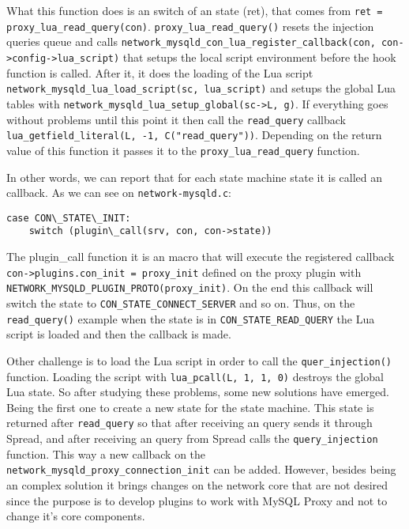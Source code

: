 What this function does is an switch of an state (ret), that comes from \texttt{ret = proxy\_lua\-\_read\_query(con)}. \texttt{proxy\_lua\_read\_query()} resets the 
injection queries queue and calls \texttt{network\_mysqld\_con\_lua\_register\_callback(con, con->config->lua\_script)} that setups the local script environment 
before the hook function is called. After it, it does the loading of the Lua script \texttt{network\_mysqld\_lua\_load\_script(sc, lua\_script)} and setups the 
global Lua tables with \texttt{network\_mysqld\_lua\_setup\_global(sc->L, g)}. If everything goes without problems until this point it then call the \texttt{read\_query} 
callback \texttt{lua\_getfield\_literal(L, -1, C("read\_query"))}. Depending on the return value of this function it passes it to the \texttt{proxy\_lua\_read\_query} function.

In other words, we can report that for each state machine state it is called an callback. As we can see on \texttt{network-mysqld.c}:\\ 

\begin{lstlisting}
case CON\_STATE\_INIT:
	switch (plugin\_call(srv, con, con->state))
\end{lstlisting}


The plugin\_call function it is an macro that will execute the registered callback \texttt{con->\-plugins.con\_init = proxy\_init} defined on the proxy plugin with \texttt{NETWORK\_MYSQLD\-\_PLUGIN\_PROTO(proxy\_init)}. On the end this callback will switch the state to \texttt{CON\-\_STATE\_CONNECT\_SERVER} and so on. Thus, on the \texttt{read\_query()} example when the state is in \texttt{CON\_STATE\_READ\_QUERY} the Lua script is loaded and then the callback is made.

Other challenge is to load the Lua script in order to call the \texttt{quer\_injection()} function. Loading the script with \texttt{lua\_pcall(L, 1, 1, 0)} destroys the global Lua state. So after studying these problems, some new solutions have emerged. Being the first one to create a new state for the state machine. This state is returned after \texttt{read\_query} so that after receiving an query sends it through Spread, and after receiving an query from Spread calls the \texttt{query\_injection} function. This way a new callback on the \texttt{network\_mysqld\-\_proxy\_connection\_init} can be added.
However, besides being an complex solution it brings changes on the network core that are not desired since the purpose is to develop plugins to work with MySQL Proxy and not to change it's core components.

